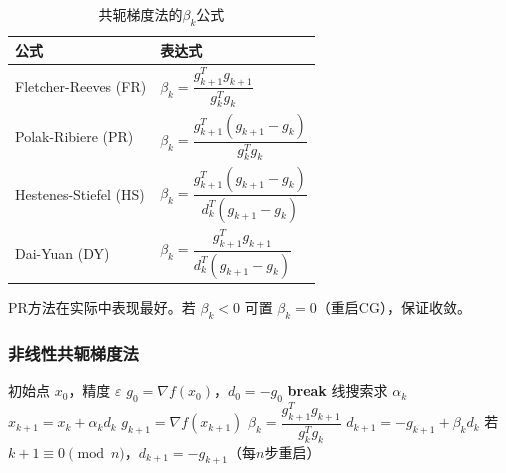 \begin{table}[H]
\centering
\caption{共轭梯度法的$\beta_k$公式}
\begin{tabular}{@{}ll@{}}
\toprule
\textbf{公式} & \textbf{表达式} \\
\midrule
Fletcher-Reeves (FR) & $\beta_k = \dfrac{g_{k+1}^T g_{k+1}}{g_k^T g_k}$ \\
Polak-Ribiere (PR) & $\beta_k = \dfrac{g_{k+1}^T(g_{k+1} - g_k)}{g_k^T g_k}$ \\
Hestenes-Stiefel (HS) & $\beta_k = \dfrac{g_{k+1}^T(g_{k+1} - g_k)}{d_k^T(g_{k+1} - g_k)}$ \\
Dai-Yuan (DY) & $\beta_k = \dfrac{g_{k+1}^T g_{k+1}}{d_k^T(g_{k+1} - g_k)}$ \\
\bottomrule
\end{tabular}
\end{table}

\begin{notebox}[PR方法]
PR方法在实际中表现最好。若 $\beta_k < 0$ 可置 $\beta_k = 0$（重启CG），保证收敛。
\end{notebox}

\subsubsection{非线性共轭梯度法}

\begin{algorithm}[H]
\caption{非线性共轭梯度法（Fletcher-Reeves）}
\begin{algorithmic}[1]
\Require 初始点 $x_0$，精度 $\varepsilon$
\State $g_0 = \nabla f(x_0)$，$d_0 = -g_0$
     \textbf{break} \EndIf
    \State 线搜索求 $\alpha_k$
    \State $x_{k+1} = x_k + \alpha_k d_k$
    \State $g_{k+1} = \nabla f(x_{k+1})$
    \State $\beta_k = \dfrac{g_{k+1}^T g_{k+1}}{g_k^T g_k}$
    \State $d_{k+1} = -g_{k+1} + \beta_k d_k$
    \State 若 $k+1 \equiv 0 \pmod n$，$d_{k+1} = -g_{k+1}$（每$n$步重启）
\EndFor
\end{algorithmic}
\end{algorithm}

